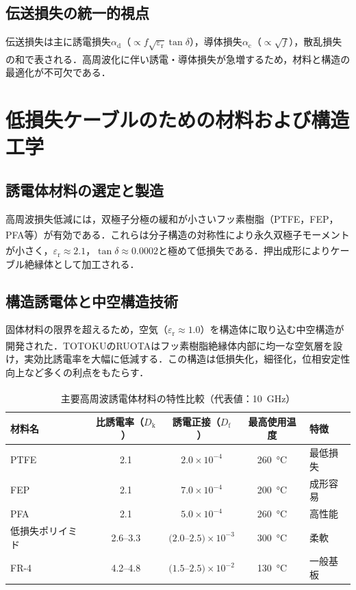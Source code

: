 \documentclass[11pt,a4paper]{ltjsarticle} %
\newcommand{\supcite}[1]{\textsuperscript{\cite{#1}}} %
\begin{document}
\subsection{伝送損失の統一的視点}
伝送損失は主に誘電損失$\alpha_\mathrm{d}$（$\propto f\sqrt{\varepsilon_\mathrm{r}}\tan\delta$），導体損失$\alpha_\mathrm{c}$（$\propto \sqrt{f}$），散乱損失の和で表される\supcite{ref5}．高周波化に伴い誘電・導体損失が急増するため，材料と構造の最適化が不可欠である．

\section{低損失ケーブルのための材料および構造工学}
\subsection{誘電体材料の選定と製造}
高周波損失低減には，双極子分極の緩和が小さいフッ素樹脂（PTFE，FEP，PFA等）が有効である\supcite{ref14,ref20}．これらは分子構造の対称性により永久双極子モーメントが小さく，$\varepsilon_\mathrm{r}\approx2.1$，$\tan\delta\approx0.0002$と極めて低損失である\supcite{ref14}．押出成形によりケーブル絶縁体として加工される．

\subsection{構造誘電体と中空構造技術}
固体材料の限界を超えるため，空気（$\varepsilon_\mathrm{r}\approx1.0$）を構造体に取り込む中空構造が開発された\supcite{ref20,ref22}．TOTOKUのRUOTAはフッ素樹脂絶縁体内部に均一な空気層を設け，実効比誘電率を大幅に低減する．この構造は低損失化，細径化，位相安定性向上など多くの利点をもたらす．


\begin{table}[htbp]
\caption{主要高周波誘電体材料の特性比較（代表値：\SI{10}{\giga\hertz}）\supcite{ref5}}
\small %
\label{tbl:materials}
\centering
\begin{tabular}{lcccp{25mm}} %
\toprule
材料名 & 比誘電率（$\mathit{D}_{\mathrm{k}}$） & 誘電正接（$\mathit{D}_{\mathrm{f}}$） & 最高使用温度 & 特徴 \\
\midrule
PTFE & 2.1 & $2.0\times10^{-4}$ & \SI{260}{\celsius} & 最低損失 \\
FEP & 2.1 & $7.0\times10^{-4}$ & \SI{200}{\celsius} & 成形容易 \\
PFA & 2.1 & $5.0\times10^{-4}$ & \SI{260}{\celsius} & 高性能 \\
低損失ポリイミド & 2.6--3.3 & $(2.0$--$2.5)\times10^{-3}$ & \SI{300}{\celsius} & 柔軟 \\
FR-4 & 4.2--4.8 & $(1.5$--$2.5)\times10^{-2}$ & \SI{130}{\celsius} & 一般基板 \\
\bottomrule
\end{tabular}
\end{table}
\normalsize
\end{document}
